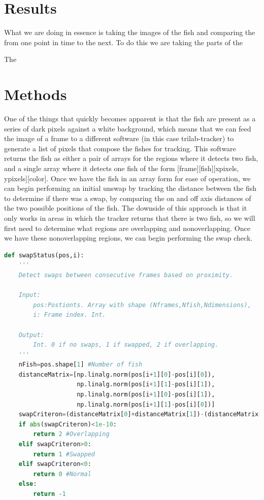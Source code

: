 \documentclass[12pt]{article}
\begin{document}
\section{Results}

What we are doing in essence is taking the images of the fish and comparing the from one point in time to the next. To do this we are taking the parts of the 

The 


\section{Methods}

One of the things that quickly becomes apparent is that the fish are present as a series of dark pixels against a white background, which means that we can feed the image of a frame to a different software (in this case trilab-tracker) to generate a list of pixels that compose the fishes for tracking. This software returns the fish as either a pair of arrays for the regions where it detects two fish, and a single array where it detects one fish of the form [frame][fish][xpixels, ypixels][color]. Once we have the fish in an array form for ease of operation, we can begin performing an initial unswap by tracking the distance between the fish to determine if there was a swap, by comparing the on and off axis distances of the two possible positions of the fish. The downside of this approach is that it only works in areas in which the tracker returns that there is two fish, so we will first need to determine what regions are overlapping and nonoverlapping. Once we have these nonoverlapping regions, we can begin performing the swap check. 

\begin{minipage}[c]{\textwidth}
\begin{lstlisting}[language=Python]
def swapStatus(pos,i):
    '''
    Detect swaps between consecutive frames based on proximity.
    
    Input:
        pos:Postionts. Array with shape (Nframes,Nfish,Ndimensions),
        i: Frame index. Int.
    
    Output:
        Int. 0 if no swaps, 1 if swapped, 2 if overlapping.
    '''
    nFish=pos.shape[1] #Number of fish
    distanceMatrix=[np.linalg.norm(pos[i+1][0]-pos[i][0]),
                    np.linalg.norm(pos[i+1][1]-pos[i][1]),
                    np.linalg.norm(pos[i+1][0]-pos[i][1]),
                    np.linalg.norm(pos[i+1][1]-pos[i][0])]
    swapCriteron=(distanceMatrix[0]+distanceMatrix[1])-(distanceMatrix[2]+distanceMatrix[3])
    if abs(swapCriteron)<1e-10:
        return 2 #Overlapping
    elif swapCriteron>0:
        return 1 #Swapped
    elif swapCriteron<0:
        return 0 #Normal
    else:
        return -1
\end{lstlisting}
\end{minipage}
\end{document}

